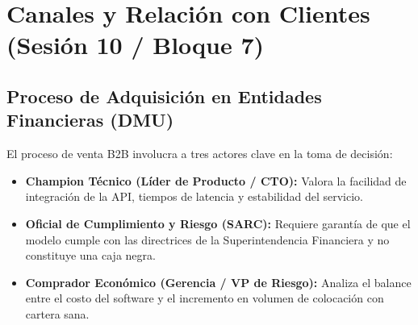 \documentclass[11pt,a4paper]{article}
\begin{document}
\newpage

\section{Canales y Relaci\'on con Clientes (Sesi\'on 10 / Bloque 7)}

\subsection{Proceso de Adquisici\'on en Entidades Financieras (DMU)}
El proceso de venta B2B involucra a tres actores clave en la toma de decisi\'on:
\begin{itemize}[leftmargin=*]
    \item \textbf{Champion T\'ecnico (L\'ider de Producto / CTO):} Valora la facilidad de integraci\'on de la API, tiempos de latencia y estabilidad del servicio.
    \item \textbf{Oficial de Cumplimiento y Riesgo (SARC):} Requiere garant\'ia de que el modelo cumple con las directrices de la Superintendencia Financiera y no constituye una caja negra.
    \item \textbf{Comprador Econ\'omico (Gerencia / VP de Riesgo):} Analiza el balance entre el costo del software y el incremento en volumen de colocaci\'on con cartera sana.
\end{itemize}
\end{document}
